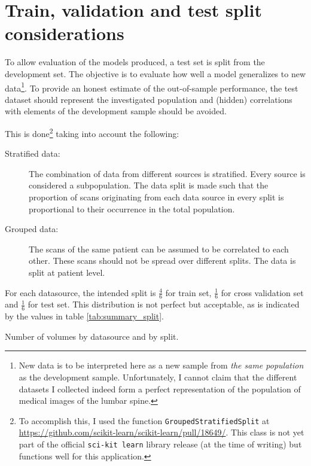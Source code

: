 \newpage
\section{Train, validation and test split considerations\label{sec:trainValTestSplit}}

To allow evaluation of the models produced, a test set is split from the development set.
The objective is to evaluate how well a model generalizes to new data\footnote{
    New data is to be interpreted here as a new sample from \textit{the same population} as the development sample.
    Unfortunately, I cannot claim that the different datasets I collected indeed form a perfect representation of the population of medical images of the lumbar spine.}. 
To provide an honest estimate of the out-of-sample performance, the test dataset should represent the investigated population and (hidden) correlations with elements of the development sample should be avoided.

This is done\footnote{
    To accomplish this, I used the function \texttt{GroupedStratifiedSplit} at \url{https://github.com/scikit-learn/scikit-learn/pull/18649/}. 
    This class is not yet part of the official \texttt{sci-kit learn} library release (at the time of writing) but functions well for this application.} taking into account the following:
\begin{description}
    \item[Stratified data:] The combination of data from different sources is stratified. Every source is considered a subpopulation. The data split is made such that the proportion of scans originating from each data source in every split is proportional to their occurrence in the total population.
    \item[Grouped data:] The scans of the same patient can be assumed to be correlated to each other. These scans should not be spread over different splits. The data is split at patient level.
\end{description}

For each datasource, the intended split is $\frac{4}{6}$ for train set, $\frac{1}{6}$ for cross validation set and $\frac{1}{6}$ for test set.
This distribution is not perfect but acceptable, as is indicated by the values in table \ref{tab:summary_split}.

\begin{table}
 
    
    \caption{Number of volumes by datasource and by split.\label{tab:summary_split}}
  
  \end{table}

